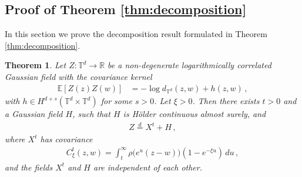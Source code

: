 \documentclass[11pt]{article}
\numberwithin{equation}{section}
\newtheorem{theorem}{Theorem}[section]
\theoremstyle{definition}
\newcommand{\R}{\mathbb{R}}
\newcommand{\E}{\mathbb{E}}
\def\T{\mathbb{T}}
\begin{document}
\subsection{Proof of Theorem \ref{thm:decomposition}}

In this section we prove the decomposition result formulated in Theorem \ref{thm:decomposition}.





 

\begin{theorem} \label{lem:coupling}
	Let $Z: \T^d \to \R$ be a non-degenerate logarithmically correlated Gaussian field with the covariance kernel
\begin{align*}
\E[Z(z)Z(w)] &= -\log d_{\T^d}(z,w) + h(z,w)\,,
\end{align*}	
	with  $h \in H^{d + s}(\T^d \times \T^d)$ for some $s>0$. Let $\xi > 0$. Then there exists $t>0$  and a Gaussian field $H$, such that $H$ is Hölder continuous almost surely, and
   \begin{align*}
   Z \overset{d}{=} X^{t}+H\,,
   \end{align*}
   where $X^{t}$ has covariance 
   \begin{align*}
     C_{\xi}^t(z,w) =  \int_{t}^{\infty} \rho \big( e^{u}(z-w) \big) (1-e^{-\xi u}) \, du\,,
   \end{align*}
   and the fields $X^t$ and $H$ are independent of each other.
\end{theorem}
\end{document}
